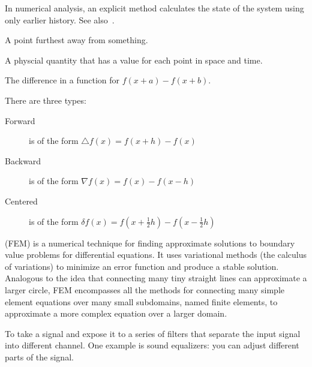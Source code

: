 \begin{definition}\label{explicitmethod}
    In numerical analysis, an explicit method calculates the state of the system
    using only earlier history. See also~.
\end{definition}


\begin{definition}
    A point furthest away from something.
\end{definition}

\begin{definition}[Field]
    A physcial quantity that has a value for each point in space and time.
\end{definition}

\begin{definition}
    The difference in a function for $f(x + a) - f(x + b)$.

    There are three types:
    \begin{description}
        \item[Forward] is of the form $\bigtriangleup{f}(x) = f(x + h) - f(x)$
        \item[Backward] is of the form $\nabla{f}(x) = f(x) - f(x - h)$
        \item[Centered] is of the form $\delta{f}(x) = f(x + \frac{1}{2}h) - f(x - \frac{1}{2}h)$
    \end{description}
\end{definition}

\begin{definition}
    (FEM) is a numerical technique for finding approximate solutions to
    boundary value problems for differential equations. It uses variational
    methods (the calculus of variations) to minimize an error function and
    produce a stable solution.  Analogous to the idea that connecting many tiny
    straight lines can approximate a larger circle, FEM encompasses all the
    methods for connecting many simple element equations over many small
    subdomains, named finite elements, to approximate a more complex equation
    over a larger domain.

\end{definition}

\begin{definition}
    To take a signal and expose it to a series of filters that separate the
    input signal into different channel. One example is sound equalizers:
    you can adjust different parts of the signal.
\end{definition}


